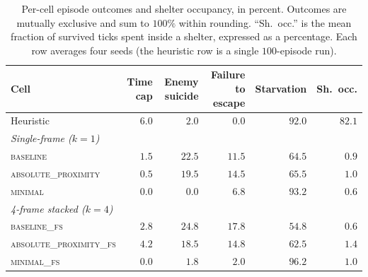 \documentclass[12pt,a4paper,titlepage]{article}
\begin{document}
\begin{table}[!ht]
\centering
\caption{Per-cell episode outcomes and shelter occupancy, in percent. Outcomes are mutually exclusive and sum to $100\%$ within rounding. ``Sh.\ occ.'' is the mean fraction of survived ticks spent inside a shelter, expressed as a percentage. Each row averages four seeds (the heuristic row is a single $100$-episode run).}
\label{tab:outcomes}
\footnotesize
\setlength{\tabcolsep}{4pt}
\begin{tabular}{lrrrrr}
\toprule
Cell & Time cap & Enemy suicide & Failure to escape & Starvation & Sh.\ occ. \\
\midrule
Heuristic                          & $6.0$ & $2.0$ & $0.0$ & $\mathbf{92.0}$ & $82.1$ \\
\midrule
\multicolumn{6}{l}{\textit{Single-frame ($k=1$)}} \\
\textsc{baseline}                  & $1.5$ & $22.5$ & $11.5$ & $\mathbf{64.5}$ & $0.9$ \\
\textsc{absolute\_proximity}       & $0.5$ & $19.5$ & $14.5$ & $\mathbf{65.5}$ & $1.0$ \\
\textsc{minimal}                   & $0.0$ & $0.0$  & $6.8$  & $\mathbf{93.2}$ & $0.6$ \\
\midrule
\multicolumn{6}{l}{\textit{4-frame stacked ($k=4$)}} \\
\textsc{baseline\_fs}              & $2.8$ & $24.8$ & $17.8$ & $\mathbf{54.8}$ & $0.6$ \\
\textsc{absolute\_proximity\_fs}   & $4.2$ & $18.5$ & $14.8$ & $\mathbf{62.5}$ & $1.4$ \\
\textsc{minimal\_fs}               & $0.0$ & $1.8$  & $2.0$  & $\mathbf{96.2}$ & $1.0$ \\
\bottomrule
\end{tabular}
\end{table}

\newpage


\end{document}
